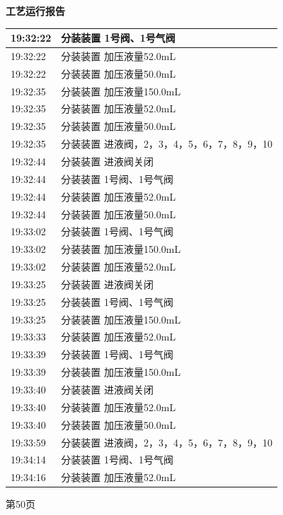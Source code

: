 \documentclass[UTF8,10pt,a4paper,fontset=fandol]{ctexart}
\begin{document}
\hfill
\begin{minipage}[t]{0.48\linewidth}
\centering
\textbf{工艺运行报告}\\[2pt]
\small
\begin{tabular}{|p{1.35cm}|p{4.65cm}|}
\hline
19:32:22 & 分装装置 1号阀、1号气阀 \\ \hline
19:32:22 & 分装装置 加压液量52.0mL \\ \hline
19:32:22 & 分装装置 加压液量50.0mL \\ \hline
19:32:35 & 分装装置 加压液量150.0mL \\ \hline
19:32:35 & 分装装置 加压液量52.0mL \\ \hline
19:32:35 & 分装装置 加压液量50.0mL \\ \hline
19:32:35 & 分装装置 进液阀，2，3，4，5，6，7，8，9，10 \\ \hline
19:32:44 & 分装装置 进液阀关闭 \\ \hline
19:32:44 & 分装装置 1号阀、1号气阀 \\ \hline
19:32:44 & 分装装置 加压液量52.0mL \\ \hline
19:32:44 & 分装装置 加压液量50.0mL \\ \hline
19:33:02 & 分装装置 1号阀、1号气阀 \\ \hline
19:33:02 & 分装装置 加压液量150.0mL \\ \hline
19:33:02 & 分装装置 加压液量52.0mL \\ \hline
19:33:25 & 分装装置 进液阀关闭 \\ \hline
19:33:25 & 分装装置 1号阀、1号气阀 \\ \hline
19:33:25 & 分装装置 加压液量150.0mL \\ \hline
19:33:33 & 分装装置 加压液量52.0mL \\ \hline
19:33:39 & 分装装置 1号阀、1号气阀 \\ \hline
19:33:39 & 分装装置 加压液量150.0mL \\ \hline
19:33:40 & 分装装置 进液阀关闭 \\ \hline
19:33:40 & 分装装置 加压液量52.0mL \\ \hline
19:33:40 & 分装装置 加压液量50.0mL \\ \hline
19:33:59 & 分装装置 进液阀，2，3，4，5，6，7，8，9，10 \\ \hline
19:34:14 & 分装装置 1号阀、1号气阀 \\ \hline
19:34:16 & 分装装置 加压液量52.0mL \\ \hline
\end{tabular}

\vspace{2pt}
第50页
\end{minipage}
\end{document}
